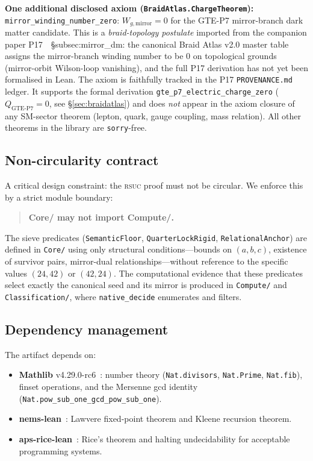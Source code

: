 \documentclass[11pt,a4paper]{article}
\theoremstyle{definition}
\newcommand{\rsuc}{\textsc{rsuc}}
\begin{document}
\medskip\noindent\textbf{One additional disclosed axiom (\texttt{BraidAtlas.ChargeTheorem}):}
\texttt{mirror\_winding\_number\_zero}: $W_{g,\text{mirror}} = 0$ for the GTE-P7
mirror-branch dark matter candidate.  This is a \emph{braid-topology postulate}
imported from the companion paper P17~\cite{SpivackBraidAtlas}~\S subsec:mirror\_dm:
the canonical Braid Atlas v2.0 master table assigns the mirror-branch winding number
to be $0$ on topological grounds (mirror-orbit Wilson-loop vanishing), and the full
P17 derivation has not yet been formalised in Lean.  The axiom is faithfully tracked
in the P17 \texttt{PROVENANCE.md} ledger.  It supports the formal derivation
\lstinline|gte_p7_electric_charge_zero| ($Q_{\text{GTE-P7}} = 0$, see
\S\ref{sec:braidatlas}) and does \emph{not} appear in the axiom closure of any
SM-sector theorem (lepton, quark, gauge coupling, mass relation).
All other theorems in the library are \texttt{sorry}-free.

\subsection{Non-circularity contract}\label{sec:noncircular}

A critical design constraint: the \rsuc{} proof must not be circular.
We enforce this by a strict module boundary:

\begin{quote}
\textbf{Core/ may not import Compute/.}
\end{quote}

\noindent
The sieve predicates (\texttt{SemanticFloor}, \texttt{QuarterLockRigid},
\texttt{RelationalAnchor}) are defined in \texttt{Core/} using only
structural conditions---bounds on $(a, b, c)$, existence of survivor
pairs, mirror-dual relationships---without reference to the specific
values $(24, 42)$ or $(42, 24)$.  The computational evidence that these
predicates select exactly the canonical seed and its mirror is produced
in \texttt{Compute/} and \texttt{Classification/}, where
\texttt{native\_decide} enumerates and filters.

\subsection{Dependency management}

The artifact depends on:
\begin{itemize}[nosep]
\item \textbf{Mathlib} v4.29.0-rc6~\cite{mathlib4}: number theory
  (\texttt{Nat.divisors}, \texttt{Nat.Prime}, \texttt{Nat.fib}),
  finset operations, and the Mersenne gcd identity
  (\texttt{Nat.pow\_sub\_one\_gcd\_pow\_sub\_one}).
\item \textbf{nems-lean}~\cite{nemsLean2025}: Lawvere fixed-point
  theorem and Kleene recursion theorem.
\item \textbf{aps-rice-lean}~\cite{apsRiceLean2025}: Rice's theorem
  and halting undecidability for acceptable programming systems.
\end{itemize}
\end{document}
